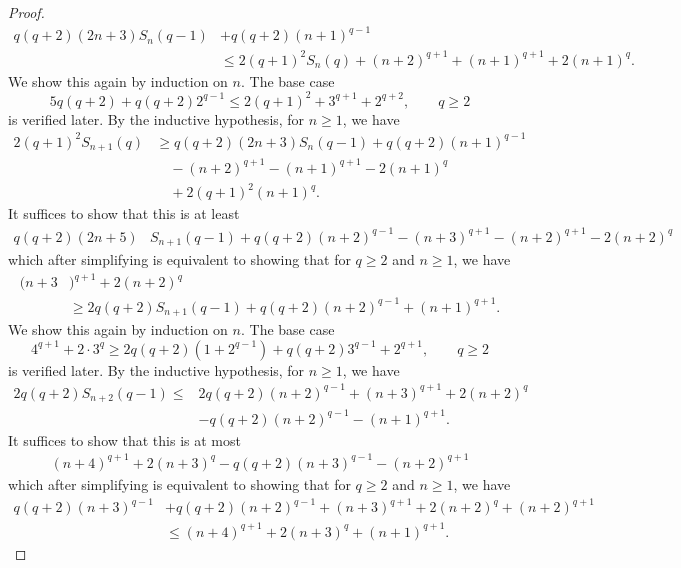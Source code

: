 \documentclass[10pt]{article}
\newcommand{\1}{\textbf{1}}
\theoremstyle{remark}
\theoremstyle{definition}
\begin{document}
\begin{proof}
\begin{align*}
q(q+2)(2n+3)S_{n}(q-1) &+ q(q+2)(n+1)^{q-1} \\
&\leq 2(q+1)^2S_{n}(q) + (n+2)^{q+1} + (n+1)^{q+1} + 2(n+1)^q.
\end{align*}
We show this again by induction on $n$. The base case
\begin{equation}\label{eq:ind3-base}
5q(q+2)+ q(q+2)2^{q-1} \leq 2(q+1)^2 + 3^{q+1} + 2^{q+2} , \qquad q \geq 2
\end{equation}
is verified later. By the inductive hypothesis, for $n \geq 1$, we have
\begin{align*}
2(q+1)^2S_{n+1}(q) &\geq q(q+2)(2n+3)S_{n}(q-1) + q(q+2)(n+1)^{q-1} \\
&\quad- (n+2)^{q+1} - (n+1)^{q+1} - 2(n+1)^q \\
&\quad+ 2(q+1)^2(n+1)^q.
\end{align*}
It suffices to show that this is at least
\begin{align*}
q(q+2)(2n+5)&S_{n+1}(q-1) + q(q+2)(n+2)^{q-1} - (n+3)^{q+1} - (n+2)^{q+1} - 2(n+2)^q
\end{align*}
which after simplifying is equivalent to showing that for $q \geq 2$ and $n \geq 1$, we have
\begin{align*}
(n+3&)^{q+1} + 2(n+2)^q \\
&\geq 2q(q+2)S_{n+1}(q-1) + q(q+2)(n+2)^{q-1}+(n+1)^{q+1}.
\end{align*}
We show this again by induction on $n$. The base case
\begin{equation}\label{eq:-ind4-base}
4^{q+1}+2\cdot 3^{q} \geq 2q(q+2)(1+2^{q-1})+q(q+2)3^{q-1}+2^{q+1}, \qquad q \geq 2
\end{equation}
is verified later. By the inductive hypothesis, for $n \geq 1$, we have
\begin{align*}
2q(q+2)S_{n+2}(q-1) \leq &2q(q+2)(n+2)^{q-1}+(n+3)^{q+1}+2(n+2)^q\\
&-q(q+2)(n+2)^{q-1}-(n+1)^{q+1}.
\end{align*}
It suffices to show that this is at most
\begin{align*}
(n+4)^{q+1}+2(n+3)^q - q(q+2)(n+3)^{q-1}-(n+2)^{q+1}
\end{align*}
which after simplifying is equivalent to showing that for $q \geq 2$ and $n \geq 1$, we have
\begin{align*}
q(q+2)(n+3)^{q-1}&+q(q+2)(n+2)^{q-1}+(n+3)^{q+1}+2(n+2)^q + (n+2)^{q+1} \\
&\leq (n+4)^{q+1}+2(n+3)^q +(n+1)^{q+1}.
\end{align*}

\end{proof}
\end{document}
